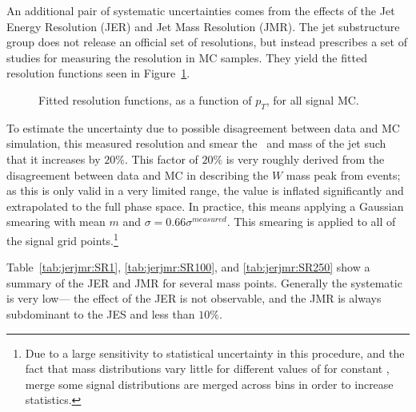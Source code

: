 An additional pair of systematic uncertainties comes from the effects of the Jet Energy Resolution (JER) and Jet Mass Resolution (JMR). The jet substructure group does not release an official set of resolutions, but instead prescribes a set of studies for measuring the resolution in MC samples. They yield the fitted resolution functions seen in Figure~\ref{fig:res}.
%
\begin{figure}[!ht]
  \centering
  
    
  \caption{Fitted resolution functions, as a function of $p_{T}$, for all signal MC.
           }
           
  \label{fig:res}
\end{figure}
%
To estimate the uncertainty due to possible disagreement between data and MC simulation, this measured resolution and smear the \pT\ and mass of the jet such that it increases by $20\%$. This factor of $20\%$ is very roughly derived from the disagreement between data and MC in describing the $W$ mass peak from \ttbar events; as this is only valid in a very limited \pt range, the value is inflated significantly and extrapolated to the full phase space. In practice, this means applying a Gaussian smearing with mean $m$ and $\sigma = 0.66\sigma^{measured}$. This smearing is applied to all of the signal grid points.\footnote{Due to a large sensitivity to statistical uncertainty in this procedure, and the fact that mass distributions vary little for different values of \mninoone for constant \mgluino, merge some signal distributions are merged across \mninoone bins in order to increase statistics.} %
%


Table~\ref{tab:jerjmr:SR1}, \ref{tab:jerjmr:SR100}, and \ref{tab:jerjmr:SR250} show a summary of the JER and JMR for several mass points. Generally the systematic is very low--- the effect of the JER is not observable, and the JMR is always subdominant to the JES and less than $10\%$.

  
